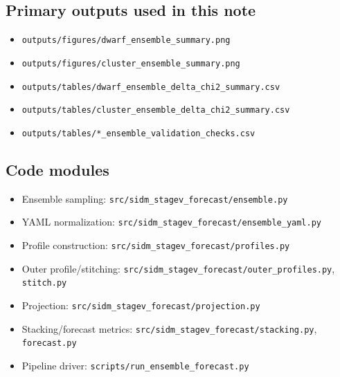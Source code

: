 \documentclass[11pt]{article}
\begin{document}
\subsection{Primary outputs used in this note}
\begin{itemize}[leftmargin=1.5em]
    \item \texttt{outputs/figures/dwarf\_ensemble\_summary.png}
    \item \texttt{outputs/figures/cluster\_ensemble\_summary.png}
    \item \texttt{outputs/tables/dwarf\_ensemble\_delta\_chi2\_summary.csv}
    \item \texttt{outputs/tables/cluster\_ensemble\_delta\_chi2\_summary.csv}
    \item \texttt{outputs/tables/*\_ensemble\_validation\_checks.csv}
\end{itemize}

\subsection{Code modules}
\begin{itemize}[leftmargin=1.5em]
    \item Ensemble sampling: \texttt{src/sidm\_stagev\_forecast/ensemble.py}
    \item YAML normalization: \texttt{src/sidm\_stagev\_forecast/ensemble\_yaml.py}
    \item Profile construction: \texttt{src/sidm\_stagev\_forecast/profiles.py}
    \item Outer profile/stitching: \texttt{src/sidm\_stagev\_forecast/outer\_profiles.py}, \texttt{stitch.py}
    \item Projection: \texttt{src/sidm\_stagev\_forecast/projection.py}
    \item Stacking/forecast metrics: \texttt{src/sidm\_stagev\_forecast/stacking.py}, \texttt{forecast.py}
    \item Pipeline driver: \texttt{scripts/run\_ensemble\_forecast.py}
\end{itemize}
\end{document}
